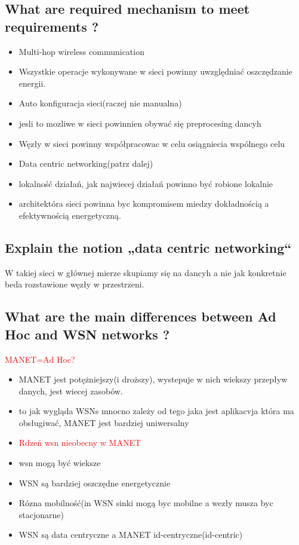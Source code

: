 \subsection{What are required mechanism to meet requirements ?}
\begin{itemize}
\item Multi-hop wireless communication
\item Wszystkie operacje wykonywane w sieci powinny uwzględniać oszczędzanie energii.
\item Auto konfiguracja sieci(raczej nie manualna)
\item jesli to mozliwe w sieci powinnien obywać się preprocesing dancyh
\item Węzły w sieci powinny współpracowac w celu osiągniecia wspólnego celu
\item Data centric networking(patrz dalej)
\item lokalność działań, jak najwiecej działań powinno być robione lokalnie
\item architektóra sieci powinna byc kompromisem miedzy dokładnością a efektywnością energetyczną.
\end{itemize}
\subsection{Explain the notion „data centric networking“}
W takiej sieci w głównej mierze skupiamy się na dancyh a nie jak konkretnie beda rozstawione węzły w przestrzeni.
\subsection{What are the main differences between Ad Hoc and WSN networks ?}
\textcolor{red}{MANET=Ad Hoc?}
\begin{itemize}
\item MANET jest potężniejszy(i droższy), wystepuje w nich wiekszy przepływ danych, jest wiecej zasobów.
\item to jak wygląda WSNs mnocno zależy od tego jaka jest aplikacvja która ma obsługiwać, MANET jest bardziej uniwersalny
\item \textcolor{red}{Rdzeń wsn nieobecny w MANET}
\item wsn mogą być wieksze
\item WSN są bardziej oszczędne energetycznie
\item Rózna mobilność(in WSN sinki mogą byc mobilne a wezły musza byc stacjonarne)
\item WSN są data centryczne a MANET id-centryczne(id-centric)


\end{itemize}
